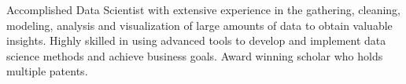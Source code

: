 

\begin{cvparagraph}

Accomplished Data Scientist with extensive experience in the gathering, cleaning, modeling, analysis and visualization of large amounts of data to obtain valuable insights. Highly skilled in using advanced tools to develop and implement data science methods and achieve business goals. Award winning scholar who holds multiple patents.

\end{cvparagraph}
